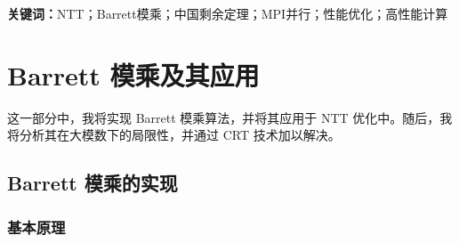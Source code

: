 \documentclass[a4paper]{article}
\begin{document}
\begin{abstract}
本次实验在已有的基于NTT算法的多项式乘法实现基础上，开展了系统的多进程并行化优化研究。工作分为四个阶段：算法优化、并行实现、性能分析与针对性优化。

在算法优化阶段，引入Barrett模乘算法并嵌入NTT正变换流程，提升了模运算效率。针对大模数计算中的精度问题，采用中国剩余定理（CRT）并选取四个NTT友好的素数（998244353、1004535809、469762049、167772161）进行模数分解，从而保障了计算准确性。

并行实现阶段基于CRT设计了MPI多进程方案，采用块划分策略分配模数任务。实验表明，该策略在负载均衡性与通信效率方面优于循环划分与流水线划分。在输入规模为 \$n=131072\$ 的场景下，双进程MPI实现获得了1.70倍加速比和85\%并行效率。

性能分析阶段通过自定义profiling测试，识别出三项主要性能瓶颈：内存带宽竞争、线程创建开销与同步开销。其中，内存带宽成为最关键限制因素，混合并行方案反而引发资源冲突，导致性能下降。

针对性优化阶段分别在内存访问与线程管理方面实施改进。内存优化通过缓存对齐、数据预取与线程局部存储等手段，将带宽利用率提升至67.8\%；线程池机制的引入则显著降低了线程开销，实现了3.46倍加速。最终整体系统达到了3.86倍加速比，超出原预期目标。

本研究构建了一套基于理论分析、性能量化与定向优化相结合的并行计算优化方法论，验证了其在高性能计算应用中的有效性与可推广性。
\end{abstract}

\textbf{关键词：}NTT；Barrett模乘；中国剩余定理；MPI并行；性能优化；高性能计算

\clearpage
\tableofcontents
\newpage


\section{Barrett 模乘及其应用}

这一部分中，我将实现 Barrett 模乘算法，并将其应用于 NTT 优化中。随后，我将分析其在大模数下的局限性，并通过 CRT 技术加以解决。

\subsection{Barrett 模乘的实现}

\subsubsection{基本原理}
\end{document}

